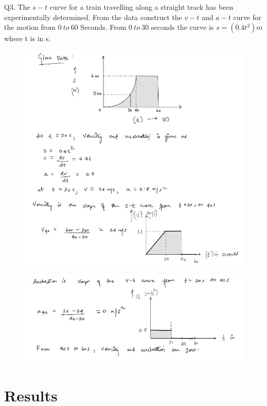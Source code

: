 \documentclass[11pt]{article}
\begin{document}
Q3. The $s-t$ curve for a train travelling along a straight track has been experimentally determined. From the data construct the $ v-t $ and $ a-t $ curve for the motion from $ 0\ to\ 60 $ Seconds. From $ 0\ to\ 30 $ seconds the curve is $ s = (0.4 t^2)m $ where t is in s. 
\begin{figure}[H]
	\includegraphics[scale=0.7]{g31.jpg}
	\label{fig: Polygon Law}
\end{figure}
\begin{figure}[H]
	\includegraphics[scale=0.6]{g32.jpg}
	\label{fig: Polygon Law}
\end{figure}
\pagebreak

\section{Results}
\end{document}
